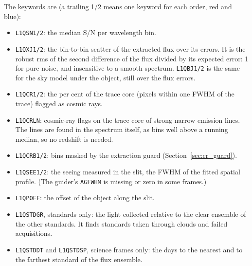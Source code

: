 The keywords are (a trailing 1/2 means one keyword for each order, red and blue):
\begin{itemize}
\item \texttt{L1QSN1/2}: the median S/N per wavelength bin.
\item \texttt{L1QXJ1/2}: the bin-to-bin scatter of the extracted flux over its errors. It is the robust rms of the
second difference of the flux divided by its expected error: 1 for pure noise, and insensitive to a smooth spectrum.
\texttt{L1QBJ1/2} is the same for the sky model under the object, still over the flux errors.
\item \texttt{L1QCR1/2}: the per cent of the trace core (pixels within one FWHM of the trace) flagged as cosmic rays.
\item \texttt{L1QCRLN}: cosmic-ray flags on the trace core of strong narrow emission lines. The lines are found in the
spectrum itself, as bins well above a running median, so no redshift is needed.
\item \texttt{L1QCRB1/2}: bins masked by the extraction guard (Section~\ref{sec:cr_guard}).
\item \texttt{L1QSEE1/2}: the seeing measured in the slit, the FWHM of the fitted spatial profile. (The guider's
\texttt{AGFWHM} is missing or zero in some frames.)
\item \texttt{L1QPOFF}: the offset of the object along the slit.
\item \texttt{L1QSTDGR}, standards only: the light collected relative to the clear ensemble of the other standards. It
finds standards taken through clouds and failed acquisitions.
\item \texttt{L1QSTDDT} and \texttt{L1QSTDSP}, science frames only: the days to the nearest and to the farthest standard
of the flux ensemble.
\end{itemize}

